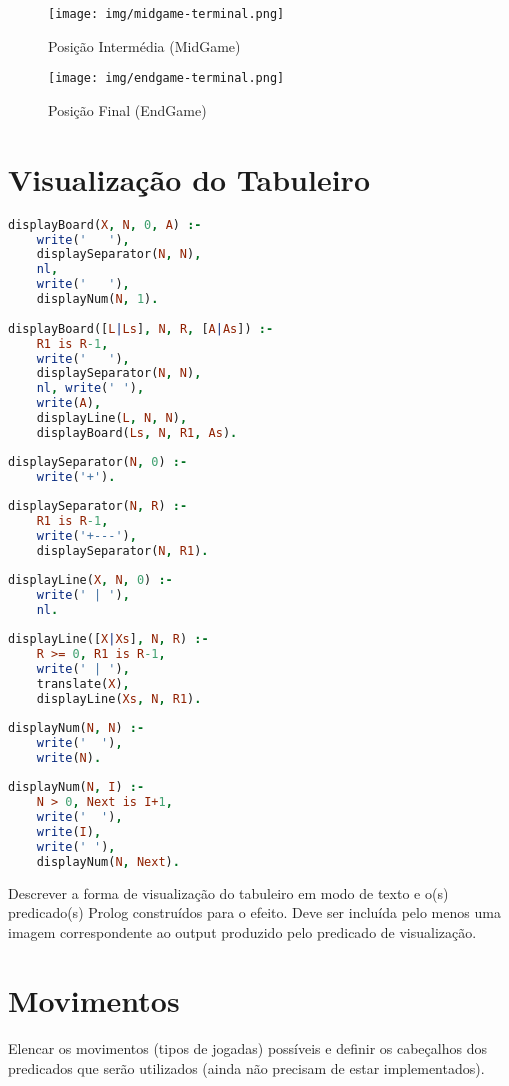 \documentclass[a4paper]{article}
\begin{document}
\begin{figure}[h!]
\centering
\begin{minipage}{.4\textwidth}
  \centering
  \texttt{[image: img/midgame-terminal.png]}
  \caption{Posição Intermédia (MidGame)}
  \label{fig:mid}
\end{minipage}%
\begin{minipage}{.4\textwidth}
  \centering
  \texttt{[image: img/endgame-terminal.png]}
  \caption{Posição Final (EndGame)}
  \label{fig:end}
\end{minipage}
\end{figure}

\section{Visualização do Tabuleiro}


\begin{lstlisting}[language=Prolog]
displayBoard(X, N, 0, A) :- 
	write('   '), 
	displaySeparator(N, N), 
	nl, 
	write('   '), 
	displayNum(N, 1).
		
displayBoard([L|Ls], N, R, [A|As]) :- 
	R1 is R-1,
	write('   '), 
	displaySeparator(N, N),
	nl, write(' '), 
	write(A),
	displayLine(L, N, N),
	displayBoard(Ls, N, R1, As).
\end{lstlisting}

\begin{lstlisting}[language=Prolog]
displaySeparator(N, 0) :- 
	write('+').
	
displaySeparator(N, R) :- 
	R1 is R-1, 
	write('+---'), 
	displaySeparator(N, R1).
\end{lstlisting}

\begin{lstlisting}[language=Prolog]
displayLine(X, N, 0) :- 
	write(' | '), 
	nl.
	
displayLine([X|Xs], N, R) :- 
	R >= 0, R1 is R-1, 
	write(' | '),
	translate(X), 
	displayLine(Xs, N, R1).
\end{lstlisting}

\begin{lstlisting}[language=Prolog]
displayNum(N, N) :- 
	write('  '), 
	write(N).
	
displayNum(N, I) :- 
	N > 0, Next is I+1, 
	write('  '), 
	write(I), 
	write(' '),
	displayNum(N, Next).
\end{lstlisting}

Descrever a forma de visualização do tabuleiro em modo de texto e o(s) predicado(s) Prolog construídos para o efeito.
Deve ser incluída pelo menos uma imagem correspondente ao output produzido pelo predicado de visualização.


\section{Movimentos}

Elencar os movimentos (tipos de jogadas) possíveis e definir os cabeçalhos dos predicados que serão utilizados (ainda não precisam de estar implementados).
\end{document}
